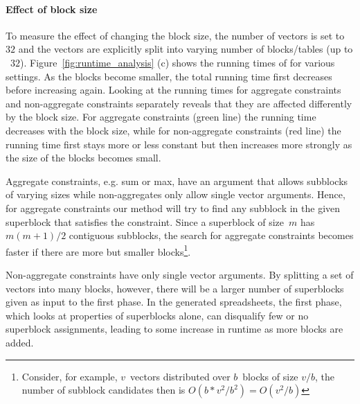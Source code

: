 \paragraph{Effect of block size}
To measure the effect of changing the block size, the number of vectors is set to~$32$ and the vectors are explicitly split into varying number of blocks/tables (up to ~$32$).
Figure~\ref{fig:runtime_analysis} (c) shows the running times of \sname for various settings.
As the blocks become smaller, the total running time first decreases before increasing again.
Looking at the running times for aggregate constraints and non-aggregate constraints  separately reveals that they are affected differently by the block size.
For aggregate constraints (green line) the running time decreases with the block size, while for non-aggregate constraints (red line) the running time first stays more or less constant but then increases more strongly as the size of the blocks becomes small.

Aggregate constraints, e.g. sum or max, have an argument that allows subblocks of varying sizes while non-aggregates only allow single vector arguments. Hence, for aggregate constraints our method will try to find any subblock in the given superblock that satisfies the constraint.
Since a superblock of size~$m$ has $m(m+1)/2$ contiguous subblocks, the search for aggregate constraints becomes faster if there are more but smaller blocks\footnote{Consider, for example, $v$~vectors distributed over $b$~blocks of size $v/b$, the number of subblock candidates then is $O(b * v^2 / b^2) = O(v^2 / b)$}.

Non-aggregate constraints have only single vector arguments.
By splitting a set of vectors into many blocks, however, there will be a larger number of superblocks given as input to the first phase. 
In the generated spreadsheets, the first phase, which looks at properties of superblocks alone, can disqualify few or no superblock assignments, leading to some increase in runtime as more blocks are added.


